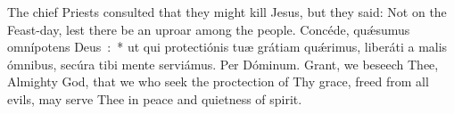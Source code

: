 {{  \let\vrtitle=\undefined
  {The chief Priests consulted that they might kill Jesus, but they said: Not on the Feast-day, lest there be an uproar among the people.}
  {Concéde, quǽsumus omnípotens Deus~:~* ut qui protectiónis tuæ grátiam quǽrimus, liberáti a malis ómnibus, secúra tibi mente serviámus. Per Dóminum.}
  {Grant, we beseech Thee, Almighty God, that we who seek the proctection of Thy grace, freed from all evils, may serve Thee in peace and quietness of spirit.}
}
\vspace{-\baselineskip}
}
